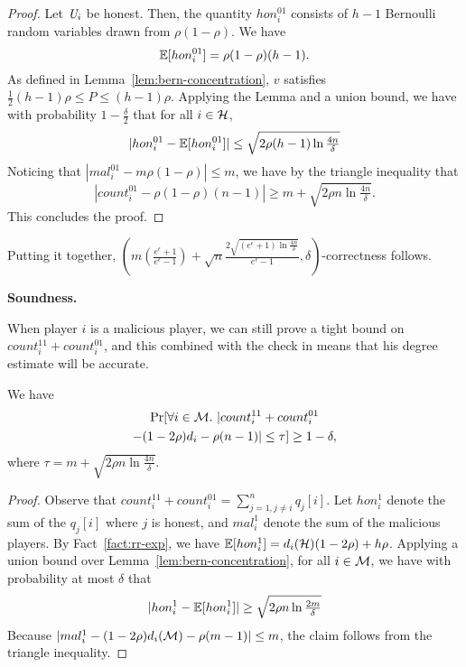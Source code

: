 \begin{proof}
Let $\textit{U}_i$ be honest. Then, the quantity $hon_i^{01}$ consists of $h-1$ Bernoulli random variables drawn from $\rho(1-\rho)$. We have
\[
    \operatorname{\mathbb{E}}[hon_i^{01}] = \rho(1-\rho)(h-1).
\]
 As defined in Lemma~\ref{lem:bern-concentration}, $v$ satisfies $\frac{1}{2}(h-1)\rho \leq P \leq (h-1)\rho$.
Applying the Lemma and a union bound, we have with probability $1-\frac{\delta}{2}$ that for all $i \in \mathcal{H}$, 
\begin{equation}\label{eq:hon-player-bits-2}
    |hon_i^{01} - \operatorname{\mathbb{E}}[hon_i^{01}]| \leq \sqrt{2\rho (h-1) \ln \tfrac{4n}{\delta}}
\end{equation}
Noticing that $|mal_i^{01} - m \rho(1-\rho)| \leq m$, we have by the triangle inequality that
\[
    |count_i^{01} - \rho(1-\rho)(n-1)| \geq m + \sqrt{2\rho n \ln \tfrac{4n}{\delta}}.
\]
This concludes the proof.
\end{proof}
Putting it together,
$\left( m (\frac{e^\epsilon+1}{e^{\epsilon}-1}) + \sqrt{n}\frac{2 \sqrt{(e^\epsilon+1)\ln \frac{4n}{\delta}}}{e^\epsilon-1}, \delta\right)$-correctness follows.

\noindent \textbf{Soundness.} 

When player $i$ is a malicious player, we can still prove a tight bound on $count_{i}^{11} + count_{i}^{01}$, and this combined with the check in \DegRRNaive{} means that his degree estimate will be accurate.

\begin{claim}\label{claim:mal-response-concentration}
We have
\begin{multline*}
    \Pr[\forall i \in \mathcal{M}.~|count_i^{11} + count_i^{01} \\ 
			-(1-2\rho)d_i - \rho(n-1)| \leq \tau ] \geq 1-\delta,
\end{multline*}
where $\tau = m + \sqrt{2 \rho n \ln \frac{4 n}{\delta}}$.
\end{claim}
\begin{proof}
Observe that $count_i^{11} + count_i^{01} = \sum_{j=1, j\neq i}^n q_{j}[i]$. Let $hon_i^{1}$ denote the sum of the $q_{j}[i]$ where $j$ is honest, and $mal_i^{1}$ denote the sum of the malicious players. By Fact~\ref{fact:rr-exp}, we have $\operatorname{\mathbb{E}}[hon_i^1] = d_i(\mathcal{H}) (1-2\rho) + h \rho$. Applying a union bound over Lemma~\ref{lem:bern-concentration}, for all $i \in \mathcal{M}$, we have with probability at most $\delta$ that
\begin{equation}\label{eq:good-event-3}
    |hon_i^1 - \operatorname{\mathbb{E}}[hon_i^1]| \geq \sqrt{2\rho n \ln \tfrac{2m}{\delta}}
\end{equation}
Because $|mal_i^1 - (1-2\rho)d_i(\mathcal{M}) - \rho (m-1)| \leq m$, the claim follows from the triangle inequality.
\end{proof}

